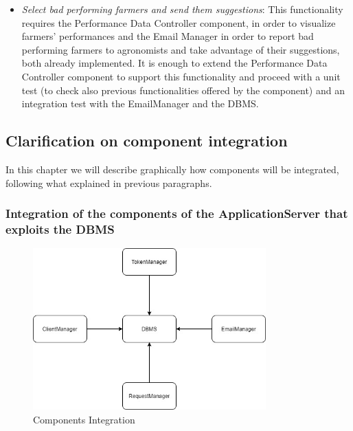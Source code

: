 \documentclass{article}
\begin{document}
\begin{itemize}
        \item \textit{Select bad performing farmers and send them suggestions}: This functionality requires the Performance Data Controller component, in order to visualize farmers’ performances and the Email Manager in order to report bad performing farmers to agronomists and take advantage of their suggestions, both already implemented. It is enough to extend the Performance Data Controller component to support this functionality and proceed with a unit test (to check also previous functionalities offered by the component) and an integration test with the EmailManager and the DBMS.
        
    \end{itemize}


\newpage


    
    \subsection{Clarification on component integration}
    
    In this chapter we will describe graphically how components will be integrated, following what explained in previous paragraphs.
    
    
    \subsubsection{Integration of the components of the ApplicationServer that exploits the DBMS}
        \begin{figure} [h]
            \centering
            \includegraphics[width=0.8\textwidth]{images/ImplementationAndTesting/ComponentsIntegration.jpg}
            \caption{\label{fig:ComponentsIntegration}Components Integration}
        \end{figure}
\end{document}
